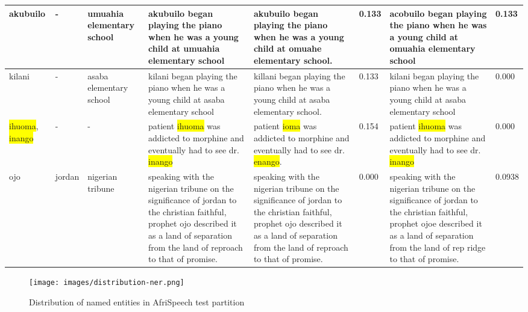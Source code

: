 \begin{table}[h]
\begin{tabular}{p{1cm}p{1cm}p{1cm}p{2.3cm}p{2.3cm}p{1cm}p{2.3cm}p{1cm}}
\hline
akubuilo & - & umuahia elementary school & akubuilo began playing the piano when he was a young child at umuahia elementary school & akubuilo began playing the piano when he was a young child at omuahe elementary school. & 0.133 & acobuilo began playing the piano when he was a young child at omuahia elementary school & 0.133 \\
\hline
kilani & - & asaba elementary school & kilani began playing the piano when he was a young child at asaba elementary school & killani began playing the piano when he was a young child at asaba elementary school. & 0.133 & kilani began playing the piano when he was a young child at asaba elementary school & 0.000 \\
\hline
\colorbox{yellow}{ihuoma}, \colorbox{yellow}{inango} & - & - & patient \colorbox{yellow}{ihuoma} was addicted to morphine and eventually had to see dr. \colorbox{yellow}{inango} & patient \colorbox{yellow}{ioma} was addicted to morphine and eventually had to see dr. \colorbox{yellow}{enango}. & 0.154 & patient \colorbox{yellow}{ihuoma} was addicted to morphine and eventually had to see dr. \colorbox{yellow}{inango} & 0.000 \\
\hline
ojo & jordan & nigerian tribune & speaking with the nigerian tribune on the significance of jordan to the christian faithful, prophet ojo described it as a land of separation from the land of reproach to that of promise. & speaking with the nigerian tribune on the significance of jordan to the christian faithful, prophet ojo described it as a land of separation from the land of reproach to that of promise. & 0.000 & speaking with the nigerian tribune on the significance of jordan to the christian faithful, prophet ojoe described it as a land of separation from the land of rep ridge to that of promise. & 0.0938 \\
\bottomrule
\end{tabular}
    \label{apdx:nigeria_ner1}
\end{table}

\begin{figure}[H]
\texttt{[image: images/distribution-ner.png]} %
\centering
\caption{Distribution of named entities in AfriSpeech test partition}
\label{fig:distribution}
\end{figure}